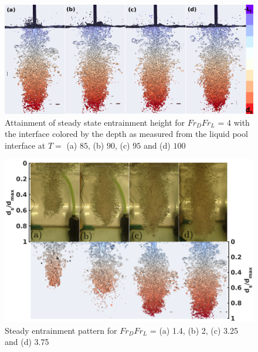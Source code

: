 \begin{figure}
	\centering
	\includegraphics[width=\linewidth]{chapters/jetPool/Figure13}
	\caption{Attainment of steady state entrainment height for $Fr_DFr_L$ = 4 with the interface colored by the depth as measured from the liquid pool interface at $T =$  (a) $85$, (b) $90$, (c) $95$ and (d) $100$}
	\label{Figure::hsteady}		
\end{figure}
\begin{figure}
	\centering
	\includegraphics[width=\linewidth]{chapters/jetPool/Figure14}
	\caption{Steady entrainment pattern for  $Fr_DFr_L$ = (a) 1.4, (b) 2, (c) 3.25 and (d) 3.75}
	\label{Figure::height_diff}		
\end{figure} 
